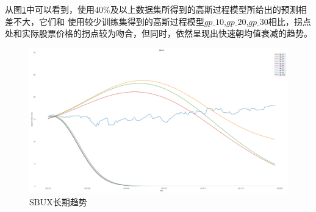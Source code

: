 从图\ref{2lab2SBUXtrend}中可以看到，使用$40\%$及以上数据集所得到的高斯过程模型所给出的预测相差不大，它们和
使用较少训练集得到的高斯过程模型$gp\_10$,$gp\_20$,$gp\_30$相比，拐点处和实际股票价格的拐点较为吻合，但同时，依然呈现出快速朝均值衰减的趋势。

\begin{figure}[!htbp]
    \centering
    \includegraphics[width=\textwidth]{images/lab2/SBUX_trend.png}
    \caption{SBUX长期趋势}\label{2lab2SBUXtrend}
\end{figure}


